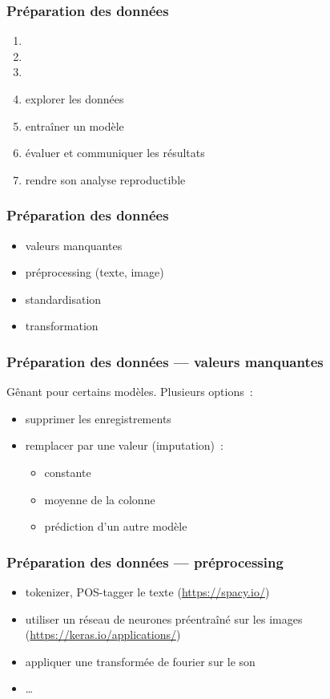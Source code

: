\documentclass{formation}
\begin{document}
\begin{frame}
  \frametitle{Préparation des données}
  \begin{enumerate}
  \item {}
  \item {}
  \item {}
  \item explorer les données
  \item entraîner un modèle
  \item évaluer et communiquer les résultats
  \item rendre son analyse reproductible
  \end{enumerate}
\end{frame}

\begin{frame}
  \frametitle{Préparation des données}

  \begin{itemize}
  \item valeurs manquantes
  \item préprocessing (texte, image)
  \item standardisation
  \item transformation
  \end{itemize}
\end{frame}

\begin{frame}
  \frametitle{Préparation des données — valeurs manquantes}

  Gênant pour certains modèles. Plusieurs options :

  \begin{itemize}[<+->]
  \item supprimer les enregistrements
  \item remplacer par une valeur (imputation) :
    \begin{itemize}[<+->]
    \item constante
    \item moyenne de la colonne
    \item prédiction d'un autre modèle
    \end{itemize}
  \end{itemize}
\end{frame}

\begin{frame}
  \frametitle{Préparation des données — préprocessing}

  \begin{itemize}
  \item tokenizer, POS-tagger le texte (\url{https://spacy.io/})
  \item utiliser un réseau de neurones préentraîné sur les images
    (\url{https://keras.io/applications/})
  \item appliquer une transformée de fourier sur le son
  \item …
  \end{itemize}
\end{frame}
\end{document}
